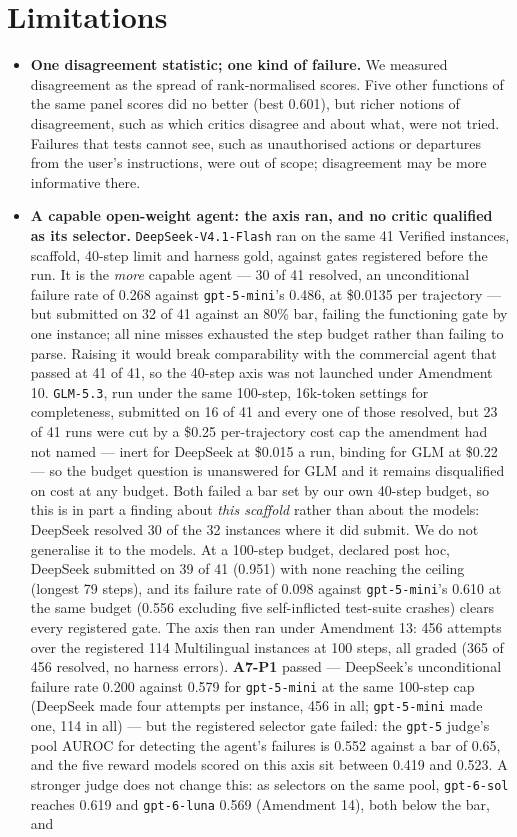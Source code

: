 \documentclass[10pt]{article}
\begin{document}
\section{Limitations}
\begin{itemize}[leftmargin=1.2em,itemsep=0pt]
\item \textbf{One disagreement statistic; one kind of failure.} We measured disagreement as the spread of rank-normalised scores. Five other functions of the same panel scores did no better (best 0.601), but richer notions of disagreement, such as which critics disagree and about what, were not tried. Failures that tests cannot see, such as unauthorised actions or departures from the user's instructions, were out of scope; disagreement may be more informative there.
\item \textbf{A capable open-weight agent: the axis ran, and no critic qualified as its selector.} \texttt{DeepSeek-V4.1-Flash} ran on the same 41 Verified instances, scaffold, 40-step limit and harness gold, against gates registered before the run. It is the \emph{more} capable agent --- 30 of 41 resolved, an unconditional failure rate of 0.268 against \texttt{gpt-5-mini}'s 0.486, at \$0.0135 per trajectory --- but submitted on 32 of 41 against an 80\% bar, failing the functioning gate by one instance; all nine misses exhausted the step budget rather than failing to parse. Raising it would break comparability with the commercial agent that passed at 41 of 41, so the 40-step axis was not launched under Amendment 10. \texttt{GLM-5.3}, run under the same 100-step, 16k-token settings for completeness, submitted on 16 of 41 and every one of those resolved, but 23 of 41 runs were cut by a \$0.25 per-trajectory cost cap the amendment had not named --- inert for DeepSeek at \$0.015 a run, binding for GLM at \$0.22 --- so the budget question is unanswered for GLM and it remains disqualified on cost at any budget. Both failed a bar set by our own 40-step budget, so this is in part a finding about \emph{this scaffold} rather than about the models: DeepSeek resolved 30 of the 32 instances where it did submit. We do not generalise it to the models. At a 100-step budget, declared post hoc, DeepSeek submitted on 39 of 41 (0.951) with none reaching the ceiling (longest 79 steps), and its failure rate of 0.098 against \texttt{gpt-5-mini}'s 0.610 at the same budget (0.556 excluding five self-inflicted test-suite crashes) clears every registered gate. The axis then ran under Amendment 13: 456 attempts over the registered 114 Multilingual instances at 100 steps, all graded (365 of 456 resolved, no harness errors). \textbf{A7-P1} passed --- DeepSeek's unconditional failure rate 0.200 against 0.579 for \texttt{gpt-5-mini} at the same 100-step cap (DeepSeek made four attempts per instance, 456 in all; \texttt{gpt-5-mini} made one, 114 in all) --- but the registered selector gate failed: the \texttt{gpt-5} judge's pool AUROC for detecting the agent's failures is 0.552 against a bar of 0.65, and the five reward models scored on this axis sit between 0.419 and 0.523. A stronger judge does not change this: as selectors on the same pool, \texttt{gpt-6-sol} reaches 0.619 and \texttt{gpt-6-luna} 0.569 (Amendment 14), both below the bar, and 
\end{itemize}
\end{document}
